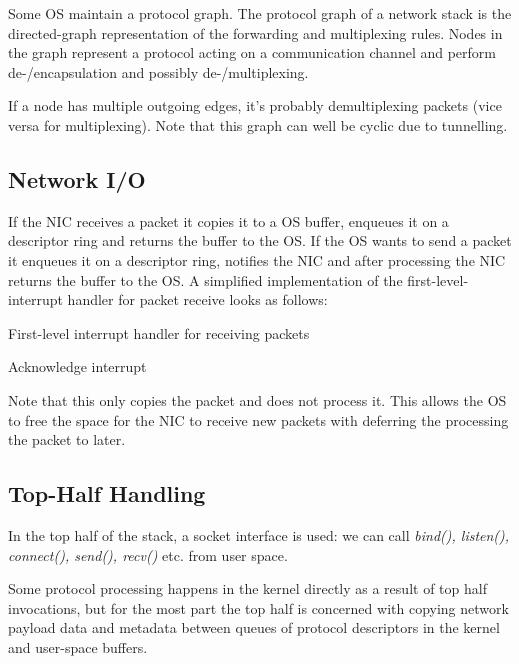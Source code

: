 Some OS maintain a protocol graph. The protocol graph of a network stack is the directed-graph representation of the forwarding and multiplexing rules. Nodes in the graph represent a protocol acting on a communication channel and perform de-/encapsulation and possibly de-/multiplexing. \medskip

If a node has multiple outgoing edges, it’s probably demultiplexing packets (vice versa for multiplexing). Note that this graph can well be cyclic due to tunnelling.


\subsection{Network I/O}

If the NIC receives a packet it copies it to a OS buffer, enqueues it on a descriptor ring and returns the buffer to the OS. If the OS wants to send a packet it enqueues it on a descriptor ring, notifies the NIC and after processing the NIC returns the buffer to the OS. A simplified implementation of the first-level- interrupt handler for packet receive looks as follows:

\begin{algorithm}[H]
\caption{First-level interrupt handler for receiving packets}
	Acknowledge interrupt \\
	\Return
\end{algorithm}

Note that this only copies the packet and does not process it. This allows the OS to free the space for the NIC to receive new packets with deferring the processing the packet to later.


\subsection{Top-Half Handling}

In the top half of the stack, a socket interface is used: we can call \textit{bind(), listen(), connect(), send(), recv()} etc. from user space. \medskip

Some protocol processing happens in the kernel directly as a result of top half invocations, but for the most part the top half is concerned with copying network payload data and metadata between queues of protocol descriptors in the kernel and user-space buffers.


